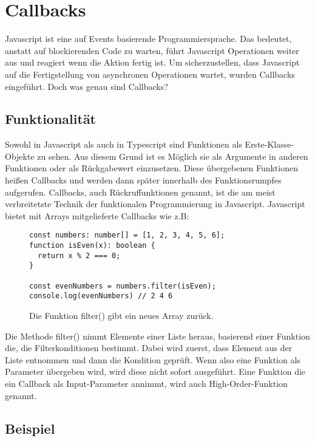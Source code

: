 \section{Callbacks}
Javascript ist eine auf Events basierende Programmiersprache. Das bedeutet, anstatt auf blockierenden Code zu warten, führt Javascript Operationen weiter aus und reagiert wenn die Aktion fertig ist. Um sicherzustellen, dass Javascript auf die Fertigstellung von asynchronen Operationen wartet, wurden Callbacks eingeführt. Doch was genau sind Callbacks?

\subsection{Funktionalität}

Sowohl in Javascript als auch in Typescript sind Funktionen als Erste-Klasse-Objekte zu sehen. Aus diesem Grund ist es Möglich sie als Argumente in anderen Funktionen oder als Rückgabewert einzusetzen. Diese übergebenen Funktionen heißen Callbacks und werden dann \glqq{}später\grqq{} innerhalb des Funktionsrumpfes aufgerufen. Callbacks, auch Rückruffunktionen genannt, ist die am meist verbreitetste Technik der funktionalen Programmierung in Javascript.\cite{callbacks-intro} Javascript bietet mit Arrays mitgelieferte Callbacks wie z.B:

\begin{figure}[H]
\begin{lstlisting}[basicstyle=\small]
const numbers: number[] = [1, 2, 3, 4, 5, 6];
function isEven(x): boolean { 
  return x % 2 === 0; 
}

const evenNumbers = numbers.filter(isEven);
console.log(evenNumbers) // 2 4 6
\end{lstlisting}
\caption{Die Funktion filter() gibt ein neues Array zurück.\cite{callbacks-example}}
\end{figure}

\noindent
Die Methode filter() nimmt Elemente einer Liste heraus, basierend einer Funktion die, die Filterkonditionen bestimmt. Dabei wird zuerst, dass Element aus der Liste entnommen und dann die Kondition geprüft. Wenn also eine Funktion als Parameter übergeben wird, wird diese nicht sofort ausgeführt. Eine Funktion die ein Callback als Input-Parameter annimmt, wird auch High-Order-Funktion genannt.

\subsection{Beispiel}


